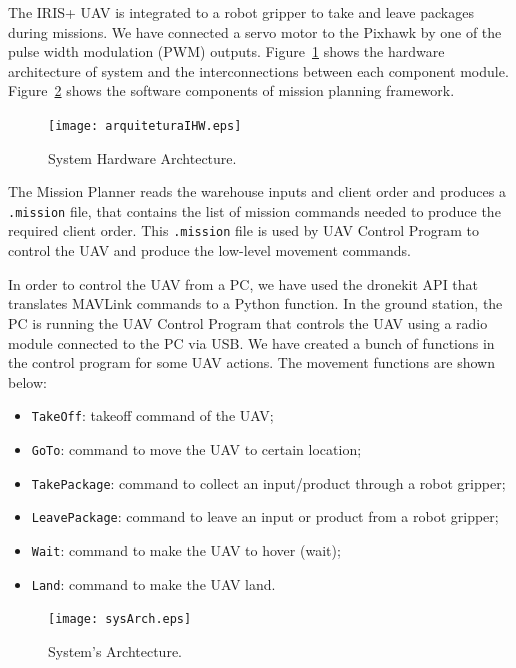 \documentclass[conference,harvard,brazil,english]{sbatex}
\begin{document}
The IRIS+ UAV is integrated to a robot gripper to take and leave packages during missions. We have connected a servo motor to the Pixhawk by one of the pulse width modulation (PWM) outputs. Figure~\ref{fig:hardArch} shows the hardware architecture of system and the interconnections between each component module. Figure~\ref{fig:sysArch} shows the software components of mission planning framework.

\begin{figure}[H]
	\centering
	\texttt{[image: arquiteturaIHW.eps]}
	\caption{System Hardware Archtecture.\label{fig:hardArch}}
\end{figure}

The Mission Planner reads the warehouse inputs and client order and produces a \texttt{.mission} file, that contains the list of mission commands needed to produce the required client order. This \texttt{.mission} file is used by UAV Control Program to control the UAV and produce the low-level movement commands.

In order to control the UAV from a PC, we have used the dronekit API that translates MAVLink commands to a Python function. In the ground station, the PC is running the UAV Control Program that controls the UAV using a radio module connected to the PC via USB. We have created a bunch of functions in the control program for some UAV actions. The movement functions are shown below:

\begin{itemize}
\item \texttt{TakeOff}: takeoff command of the UAV;
\item \texttt{GoTo}: command to move the  UAV to certain location;
\item \texttt{TakePackage}: command to collect an input/product through a robot gripper;
\item \texttt{LeavePackage}: command to leave an input or product from a robot gripper;
\item \texttt{Wait}: command to make the UAV to hover (wait);
\item \texttt{Land}: command to make the UAV land.
\end{itemize}


\begin{figure}[H]
	\centering
	\texttt{[image: sysArch.eps]}
	\caption{System's Archtecture.\label{fig:sysArch}}
\end{figure}

\end{document}
